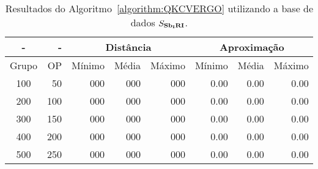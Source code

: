 \begin{table}[!htb]
  \caption{Resultados do Algoritmo~\ref{algorithm:QKCVERGO} utilizando a base de dados $S_{\textbf{Sb\textsubscript{I}RI}}{}$.}
  \label{table:GBAOFAHZ}
  \centering
  \begin{tabular}{|c|r|r|r|r|r|r|r|}
    \hline
      -      &  -   & \multicolumn{3}{c|}{Distância}             & \multicolumn{3}{c|}{Aproximação}           \\ \hline
    Grupo    & OP   & Mínimo       & Média        & Máximo       & Mínimo       & Média        & Máximo       \\ \hline  
    100      & 50   & 000          & 000          & 000          & 0.00         & 0.00         & 0.00         \\ \hline
    200      & 100  & 000          & 000          & 000          & 0.00         & 0.00         & 0.00         \\ \hline
    300      & 150  & 000          & 000          & 000          & 0.00         & 0.00         & 0.00         \\ \hline
    400      & 200  & 000          & 000          & 000          & 0.00         & 0.00         & 0.00         \\ \hline
    500      & 250  & 000          & 000          & 000          & 0.00         & 0.00         & 0.00         \\ \hline    
  \end{tabular}
\end{table}